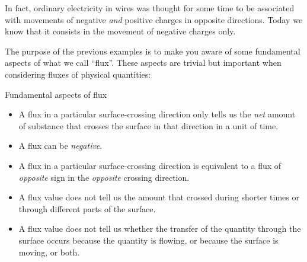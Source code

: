 \documentclass[a4paper,12pt,%
onecolumn,oneside,%
british%
]{memoir}
\renewcommand*{\|}[1][]{\nonscript\:#1\vert\nonscript\:\mathopen{}}
\begin{document}
%
In fact, ordinary electricity in wires was thought for some time to be associated with movements of negative \emph{and} positive charges in opposite directions. Today we know that it consists in the movement of negative charges only.

\medskip

The purpose of the previous examples is to make you aware of some fundamental aspects of what we call \enquote{flux}. These aspects are trivial but important when considering fluxes of physical quantities:
%
\begin{definition}{Fundamental aspects of flux}\label{def:symmetryflux}
  \begin{itemize}[nosep,shift]
  \item A flux in a particular surface-crossing direction only tells us the \emph{net} amount of substance that crosses the surface in that direction in a unit of time.

  \item A flux can be \emph{negative}.

  \item A flux in a particular surface-crossing direction is equivalent to a flux of \emph{opposite} sign in the \emph{opposite} crossing direction.
  \end{itemize}
\end{definition}

\begin{warning}
  \begin{itemize}[nosep,shift]
  \item A flux value does not tell us the amount that crossed during shorter times or through different parts of the surface.

\item A flux value does not tell us whether the transfer of the quantity through the surface occurs because the quantity is flowing, or because the surface is moving, or both.
  \end{itemize}
\end{warning}
\end{document}
